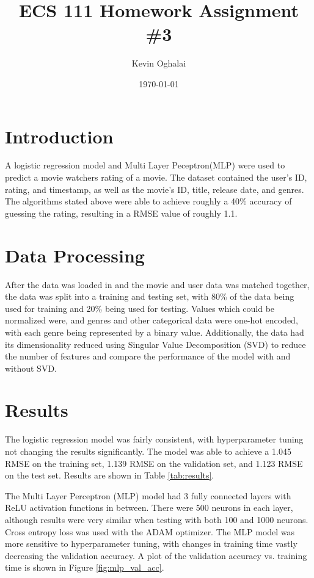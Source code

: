 \documentclass[12pt]{article}
\title{ECS 111 Homework Assignment \#3}
\author{Kevin Oghalai}
\date{\today}
\begin{document}
\maketitle
\section{Introduction}
A logistic regression model and Multi Layer Peceptron(MLP) were used to predict 
a movie watchers rating of a movie. The dataset contained the user's ID, 
rating, and timestamp, as well as the movie's ID, title, release date, and genres.
The algorithms stated above were able to achieve roughly a 40\% accuracy of guessing the 
rating, resulting in a RMSE value of roughly 1.1. 

\section{Data Processing}
After the data was loaded in and the movie and user data was matched 
together, the data was split into a training and testing set, with 80\% of the data
being used for training and 20\% being used for testing. 
Values which could be normalized were, and genres and other categorical data were
one-hot encoded, with each genre being represented by a binary value. 
Additionally, the data had its dimensionality reduced using Singular 
Value Decomposition (SVD) to reduce the number of features and compare the 
performance of the model with and without SVD. 



\section{Results}
The logistic regression model was fairly consistent, with hyperparameter tuning
not changing the results significantly. The model was able to achieve a 1.045 RMSE 
on the training set, 1.139 RMSE on the validation set, and 1.123 RMSE on the test set. 
Results are shown in Table \ref{tab:results}.

The Multi Layer Perceptron (MLP) model had 3 fully connected layers 
with ReLU activation 
functions in between. There were 500 neurons in each layer, although results
were very similar when testing with both 100 and 1000 neurons.
Cross entropy loss was used with the ADAM optimizer. 
The MLP model was more sensitive to 
hyperparameter tuning, with changes in training time vastly 
decreasing the validation accuracy. A plot of the validation 
accuracy vs. training time is shown in Figure \ref{fig:mlp_val_acc}. 
\end{document}
